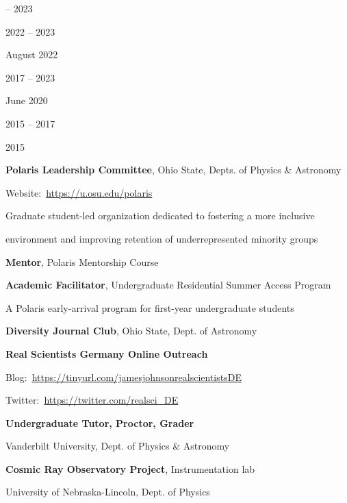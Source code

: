 \documentclass[cv.tex]{subfiles}
\begin{document}
\noindent
\parbox{0.18\textwidth}{%
	 -- 2023 \par
	\null \par
	\null \par
	\null \par
	2022 -- 2023 \par
	August 2022 \par
	\null \par
	2017 -- 2023 \par
	June 2020 \par
	\null \par
	\null \par
	2015 -- 2017 \par
	\null \par
	2015 \par
	\null \par
}
\hspace{1mm}
\parbox{0.8\textwidth}{%
	\vspace{1mm}
	\textbf{Polaris Leadership Committee}, Ohio State, Depts. of Physics \&
	Astronomy \par
	Website:~\url{https://u.osu.edu/polaris} \par
	Graduate student-led organization dedicated to fostering a more inclusive
	\par
	environment and improving retention of underrepresented minority groups \par
	\textbf{Mentor}, Polaris Mentorship Course \par
	\textbf{Academic Facilitator}, Undergraduate Residential Summer Access
	Program \par
	A Polaris early-arrival program for first-year undergraduate students \par
	\textbf{Diversity Journal Club}, Ohio State, Dept. of Astronomy \par
	\textbf{Real Scientists Germany Online Outreach} \par
	Blog:~\url{https://tinyurl.com/jamesjohnsonrealscientistsDE} \par
	Twitter:~\url{https://twitter.com/realsci_DE} \par
	\textbf{Undergraduate Tutor, Proctor, Grader} \par
	Vanderbilt University, Dept. of Physics \& Astronomy \par
	\textbf{Cosmic Ray Observatory Project}, Instrumentation lab \par
	University of Nebraska-Lincoln, Dept. of Physics \par
}
\end{document}
